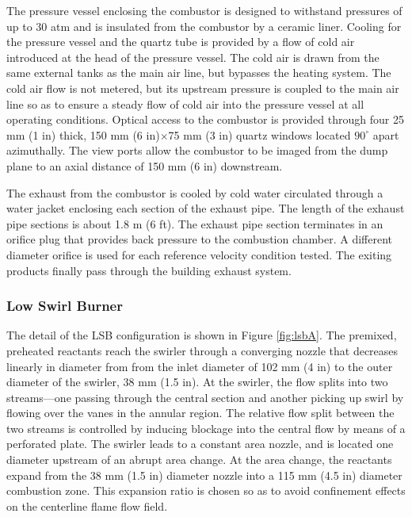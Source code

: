The pressure vessel enclosing the combustor is designed to withstand pressures of up to 30 atm and is insulated from the combustor by a ceramic liner.
Cooling for the pressure vessel and the quartz tube is provided by a flow of cold air introduced at the head of the pressure vessel.
The cold air is drawn from the same external tanks as the main air line, but bypasses the heating system.
The cold air flow is not metered, but its upstream pressure is coupled to the main air line so as to ensure a steady flow of cold air into the pressure vessel at all operating conditions.
Optical access to the combustor is provided through four 25 mm (1 in) thick, 150 mm (6 in)\(\times\)75 mm (3 in) quartz windows located \(90^\circ\) apart azimuthally.
The view ports allow the combustor to be imaged from the dump plane to an axial distance of 150 mm (6 in) downstream.

The exhaust from the combustor is cooled by cold water circulated through a water jacket enclosing each section of the exhaust pipe.
The length of the exhaust pipe sections is about 1.8 m (6 ft).
The exhaust pipe section terminates in an orifice plug that provides back pressure to the combustion chamber.
A different diameter orifice is used for each reference velocity condition tested.
The exiting products finally pass through the building exhaust system.

\subsubsection{Low Swirl Burner}
\label{subsubsec:configuration-a-low-swirl-burner}



The detail of the LSB configuration is shown in Figure \ref{fig:lsbA}.
The premixed, preheated reactants reach the swirler through a converging nozzle that decreases linearly in diameter from from the inlet diameter of 102 mm (4 in) to the outer diameter of the swirler, 38 mm (1.5 in).
At the swirler, the flow splits into two streams---one passing through the central section and another picking up swirl by flowing over the vanes in the annular region.
The relative flow split between the two streams is controlled by inducing blockage into the central flow by means of a perforated plate.
The swirler leads to a constant area nozzle, and is located one diameter upstream of an abrupt area change.
At the area change, the reactants expand from the 38 mm (1.5 in) diameter nozzle into a 115 mm (4.5 in) diameter combustion zone.
This expansion ratio is chosen so as to avoid confinement effects on the centerline flame flow field.\cite{1998-yegian}

